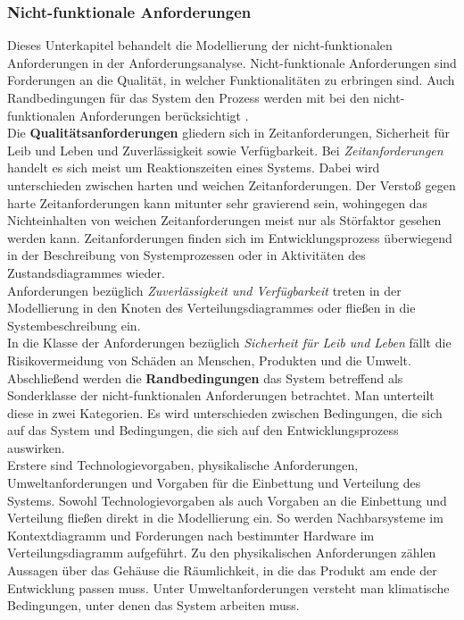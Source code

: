 \documentclass[../../../Bachelorarbeit.tex]{subfiles}
\begin{document}

\subsubsection{Nicht-funktionale Anforderungen}
Dieses Unterkapitel behandelt die Modellierung der nicht-funktionalen Anforderungen in der Anforderungsanalyse. Nicht-funktionale Anforderungen sind Forderungen an die Qualität, in welcher Funktionalitäten zu erbringen sind. Auch Randbedingungen für das System \bzw den Prozess werden mit bei den nicht-funktionalen Anforderungen berücksichtigt \cite[337]{Lauber1999}.\\
Die \textbf{Qualitätsanforderungen} gliedern sich in Zeitanforderungen, Sicherheit für Leib und Leben und Zuverlässigkeit sowie Verfügbarkeit. Bei \textit{Zeitanforderungen} handelt es sich meist um Reaktionszeiten eines Systems. Dabei wird unterschieden zwischen harten und weichen Zeitanforderungen. Der Verstoß gegen harte Zeitanforderungen kann mitunter sehr gravierend sein, wohingegen das Nichteinhalten von weichen Zeitanforderungen meist nur als Störfaktor gesehen werden kann. Zeitanforderungen finden sich im Entwicklungsprozess überwiegend in der Beschreibung von Systemprozessen oder in Aktivitäten des Zustandsdiagrammes wieder.\\
Anforderungen bezüglich \textit{Zuverlässigkeit und Verfügbarkeit} treten in der Modellierung in den Knoten des Verteilungsdiagrammes oder fließen in die Systembeschreibung ein.\\
In die Klasse der Anforderungen bezüglich \textit{Sicherheit für Leib und Leben} fällt die Risikovermeidung von Schäden an Menschen, Produkten und die Umwelt.\\
Abschließend werden die \textbf{Randbedingungen} das System betreffend als Sonderklasse der nicht-funktionalen Anforderungen betrachtet. Man unterteilt diese in zwei Kategorien. Es wird unterschieden zwischen Bedingungen, die sich auf das System und Bedingungen, die sich auf den Entwicklungsprozess auswirken.\\
Erstere sind Technologievorgaben, physikalische Anforderungen, Umweltanforderungen und Vorgaben für die Einbettung und Verteilung des Systems. Sowohl Technologievorgaben als auch Vorgaben an die Einbettung und Verteilung fließen direkt in die Modellierung ein. So werden \bspw Nachbarsysteme im Kontextdiagramm und Forderungen nach bestimmter Hardware im Verteilungsdiagramm aufgeführt. Zu den physikalischen Anforderungen zählen \zB Aussagen über das Gehäuse \bzw die Räumlichkeit, in die das Produkt am ende der Entwicklung passen muss. Unter Umweltanforderungen versteht man \bspw klimatische Bedingungen, unter denen das System arbeiten muss.\\
\end{document}
